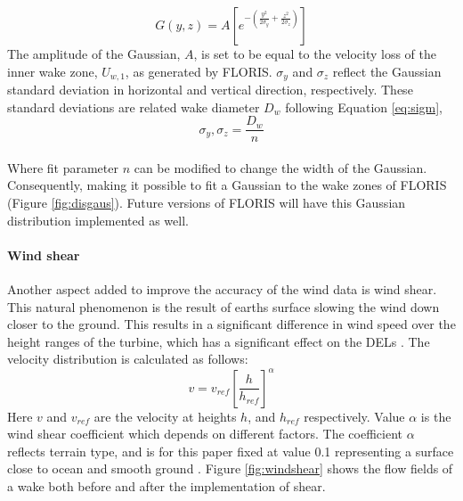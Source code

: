 \begin{equation}
\label{eq:gaus}
G(y, z) = A [e^{-(\frac{y^2}{2\sigma_y} + \frac{z^2}{2\sigma_z})}]
\end{equation}
The amplitude of the Gaussian, $A$, is set to be equal to the velocity loss of the inner wake zone, $U_{w,1}$, as generated by FLORIS. $\sigma_y$ and $\sigma_z$ reflect the Gaussian standard deviation in horizontal and vertical direction, respectively. These standard deviations are related wake diameter $D_{w}$ following Equation \ref{eq:sigm},
\begin{equation}
\label{eq:sigm}
\sigma_y,\sigma_z = \frac{D_{w}}{n} 
\end{equation}
\\
Where fit parameter $n$ can be modified to change the width of the Gaussian. Consequently, making it possible to fit a Gaussian to the wake zones of FLORIS (Figure \ref{fig:disgaus}). Future versions of FLORIS will have this Gaussian distribution implemented as well. 

\paragraph{Wind shear} \label{sec:windshear}
Another aspect added to improve the accuracy of the wind data is wind shear. This natural phenomenon is the result of earths surface slowing the wind down closer to the ground. This results in a significant difference in wind speed over the height ranges of the turbine, which has a significant effect on the DELs \cite{Firtin2011}.  The velocity distribution is calculated as follows: 
\begin{equation}
\label{eq:shear}
v = v_{ref} \left[\frac{h}{h_{ref}}\right]^\alpha
\end{equation}
Here $v$ and $v_{ref}$ are the velocity at heights $h$, and $h_{ref}$  respectively. Value $\alpha$ is the wind shear coefficient which depends on different factors. The coefficient $\alpha$  reflects terrain type, and is for this paper fixed at value 0.1 representing a surface close to ocean and smooth ground \cite{Firtin2011}. Figure \ref{fig:windshear} shows the flow fields of a wake both before and after the implementation of shear.


